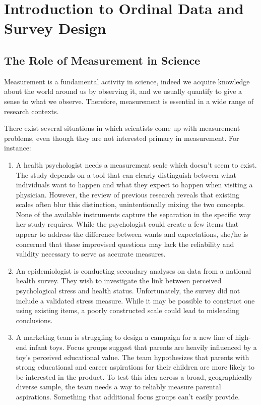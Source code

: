\documentclass[
  letterpaper,
  DIV=11,
  numbers=noendperiod]{scrartcl}
\begin{document}
\hypertarget{introduction-to-ordinal-data-and-survey-design}{%
\section{Introduction to Ordinal Data and Survey
Design}\label{introduction-to-ordinal-data-and-survey-design}}

\hypertarget{the-role-of-measurement-in-science}{%
\subsection{The Role of Measurement in
Science}\label{the-role-of-measurement-in-science}}

Measurement is a fundamental activity in science, indeed we acquire
knowledge about the world around us by observing it, and we usually
quantify to give a sense to what we observe. Therefore, measurement is
essential in a wide range of research contexts.

There exist several situations in which scientists come up with
measurement problems, even though they are not interested primary in
measurement. For instance:

\begin{enumerate}
\def\labelenumi{\arabic{enumi})}
\item
  A health psychologist needs a measurement scale which doesn't seem to
  exist. The study depends on a tool that can clearly distinguish
  between what individuals want to happen and what they expect to happen
  when visiting a physician. However, the review of previous research
  reveals that existing scales often blur this distinction,
  unintentionally mixing the two concepts. None of the available
  instruments capture the separation in the specific way her study
  requires. While the psychologist could create a few items that appear
  to address the difference between wants and expectations, she/he is
  concerned that these improvised questions may lack the reliability and
  validity necessary to serve as accurate measures.
\item
  An epidemiologist is conducting secondary analyses on data from a
  national health survey. They wish to investigate the link between
  perceived psychological stress and health status. Unfortunately, the
  survey did not include a validated stress measure. While it may be
  possible to construct one using existing items, a poorly constructed
  scale could lead to misleading conclusions.
\item
  A marketing team is struggling to design a campaign for a new line of
  high-end infant toys. Focus groups suggest that parents are heavily
  influenced by a toy's perceived educational value. The team
  hypothesizes that parents with strong educational and career
  aspirations for their children are more likely to be interested in the
  product. To test this idea across a broad, geographically diverse
  sample, the team needs a way to reliably measure parental aspirations.
  Something that additional focus groups can't easily provide.
\end{enumerate}
\end{document}

